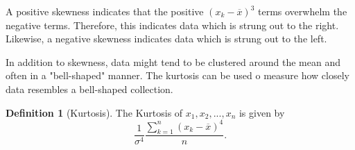 \documentclass[10pt,]{book}
\theoremstyle{plain}
\theoremstyle{definition}
\newtheorem{definition}[theorem]{Definition}
\theoremstyle{definition}
\theoremstyle{definition}
\numberwithin{equation}{section}
\begin{document}
A positive skewness indicates that the positive \((x_k - \overline{x})^3\) terms overwhelm the negative terms. Therefore, this indicates data which is strung out to the right. Likewise, a negative skewness indicates data which is strung out to the left.
%
\par

In addition to skewness, data might tend to be clustered around the mean and often in a "bell-shaped" manner. The kurtosis can be used o measure how closely data resembles a bell-shaped collection.
%
\begin{definition}[{Kurtosis}]\label{definition-16}
The Kurtosis of \(x_1, x_2, ..., x_n\) is given by
\begin{equation*} \frac{1}{\sigma^4} \frac{\sum_{k=1}^n ( x_k-\overline{x} )^4}{n}.\end{equation*}
%
\end{definition}
\par
\end{document}
